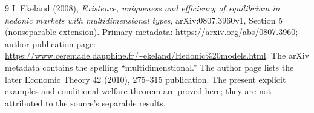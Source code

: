 \documentclass[11pt,a4paper]{article}
\theoremstyle{remark}
\begin{document}
\begin{thebibliography}{9}
 I. Ekeland (2008), \emph{Existence, uniqueness and efficiency of equilibrium in hedonic markets with multidimensional types}, arXiv:0807.3960v1, Section 5 (nonseparable extension). Primary metadata: \url{https://arxiv.org/abs/0807.3960}; author publication page: \url{https://www.ceremade.dauphine.fr/~ekeland/Hedonic%20models.html}. The arXiv metadata contains the spelling ``multidimenstional.'' The author page lists the later Economic Theory 42 (2010), 275--315 publication. The present explicit examples and conditional welfare theorem are proved here; they are not attributed to the source's separable results.
\end{thebibliography}
\end{document}
